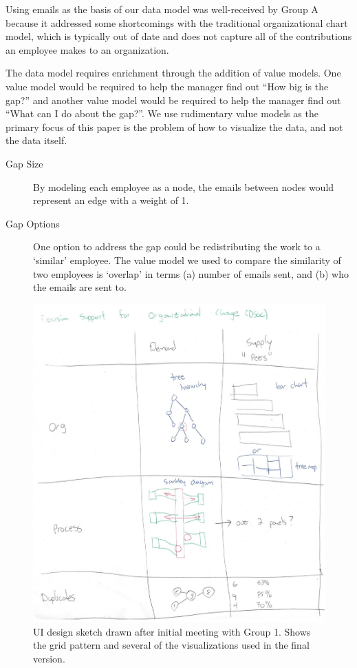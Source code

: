 \documentclass[journal]{vgtc}                %
\begin{document}
Using emails as the basis of our data model was well-received by Group A because it addressed some shortcomings with the traditional organizational chart model, which is typically out of date and does not capture all of the contributions an employee makes to an organization.

The data model requires enrichment through the addition of value models.  One value model would be required to help the manager find out ``How big is the gap?'' and another value model would be required to help the manager find out ``What can I do about the gap?''.  We use rudimentary value models as the primary focus of this paper is the problem of how to visualize the data, and not the data itself.

\begin{description}
\item [Gap Size] By modeling each employee as a node, the emails between nodes would represent an edge with a weight of 1.
\item [Gap Options] One option to address the gap could be redistributing the work to a \lq similar\rq{} employee. The value model we used to compare the similarity of two employees is \lq overlap\rq{} in terms (a) number of emails sent, and (b) who the emails are sent to.
\end{description}

\begin{figure}
	\centering
	\includegraphics[width=\columnwidth]{pictures/Sketch.jpg}
	\caption{UI design sketch drawn after initial meeting with Group 1. Shows the grid pattern and several of the visualizations used in the final version.}
	\label{fig:sketch}
\end{figure}
\end{document}
